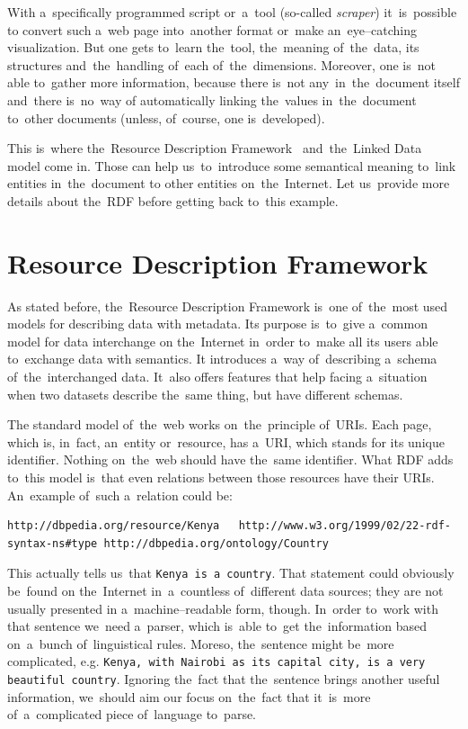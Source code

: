 With a~specifically programmed script or~a~tool (so-called \emph{scraper}) it~is~possible to
convert such a~web page into~another format or~make an~eye--catching visualization.
But one gets to~learn the~tool, the~meaning of~the~data, its structures and~the~handling of~each of~the~dimensions. Moreover, one is~not able to~gather more information,
because there is~not any~in~the~document itself and~there is~no~way of
automatically linking the~values in~the~document to~other documents (unless, of~course,
one is~developed).

This is~where the~Resource Description Framework~\cite{rdf} and~the~Linked Data~\cite{ld}
model come in. Those
can help us~to~introduce some semantical meaning to~link entities in~the~document to
other entities on~the~Internet. Let us~provide more details about the~RDF before getting
back to~this example.

\section{Resource Description Framework}
As stated before, the~Resource Description Framework is~one of~the~most used models for
describing data with metadata. Its purpose is~to~give a~common model for data interchange
on the~Internet in~order to~make all its users able to~exchange data with semantics.
It introduces a~way of~describing a~schema of~the~interchanged data. It~also 
offers features that help facing a~situation when two datasets describe the~same thing,
but have different schemas.

The standard model of~the~web works on~the~principle of~URIs. Each page, which is, in~fact,
an~entity or~resource, has a~URI, which stands for its unique identifier. Nothing on~the~web
should have the~same identifier. What RDF adds to~this model is~that even relations
between those resources have their URIs. An~example of~such a~relation could be:

\tiny\begin{verbatim}
http://dbpedia.org/resource/Kenya   http://www.w3.org/1999/02/22-rdf-syntax-ns#type http://dbpedia.org/ontology/Country  
\end{verbatim}\normalsize

This actually tells us~that \texttt{Kenya is~a~country}. That statement could obviously be~found on
the~Internet in~a~countless of~different data sources; they are not usually presented
in a~machine--readable form, though. In~order to~work with that sentence we~need a~parser, which is~able to~get the~information based on~a~bunch of~linguistical rules.
Moreso, the~sentence might be~more complicated, e.g. \texttt{Kenya, with Nairobi as~its capital city,
is a~very beautiful country}. Ignoring the~fact that the~sentence brings another useful
information, we~should aim our focus on~the~fact that it~is~more of~a~complicated piece of~language to~parse. 

